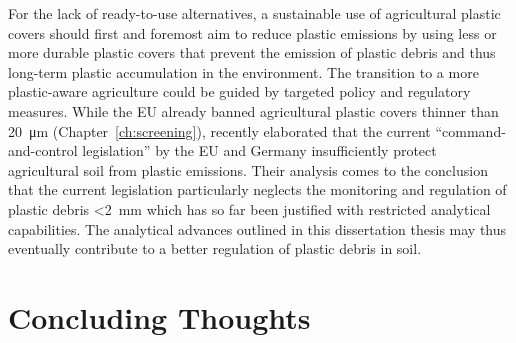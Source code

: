 For the lack of ready-to-use alternatives, a sustainable use of agricultural plastic covers should first and foremost aim to reduce plastic emissions by using less or more durable plastic covers that prevent the emission of plastic debris and thus long-term plastic accumulation in the environment.
The transition to a more plastic-aware agriculture could be guided by targeted policy and regulatory measures. While the EU already banned agricultural plastic covers thinner than \SI{20}{\micro\meter} (Chapter~\ref{ch:screening}), \citet{StubenrauchPlastic2020} recently elaborated that the current ``command-and-control legislation'' by the EU and Germany insufficiently protect agricultural soil from plastic emissions. Their analysis comes to the conclusion that the current legislation particularly neglects the monitoring and regulation of plastic debris \SI{<2}{\milli\meter} which has so far been justified with restricted analytical capabilities. The analytical advances outlined in this dissertation thesis may thus eventually contribute to a better regulation of plastic debris in soil.

\section{Concluding Thoughts}
\label{sec:general-discussion:conclusion}

